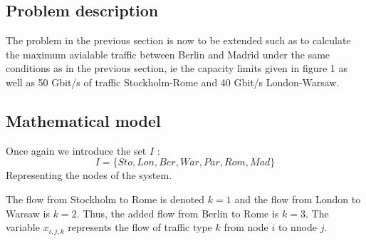 \subsection{Problem description}

The problem in the previous section is now to be extended such as to calculate the maximum  avialable traffic between Berlin and Madrid under the same conditions as in the previous section, ie the capacity limits given in figure 1 as well as 50 Gbit/s of traffic Stockholm-Rome and 40 Gbit/s London-Warsaw.

\subsection{Mathematical model}
Once again we introduce the set $I$ :
$$I = \{ Sto,Lon,Ber,War,Par,Rom,Mad\}$$
Representing the nodes of the system.

The flow from Stockholm to Rome is denoted $k=1$ and the flow from London to Warsaw is $k=2$. Thus, the added flow from Berlin to Rome is $k=3$. The variable $x_{i,j,k}$ represents the flow of traffic type $k$ from node $i$ to nnode $j$.